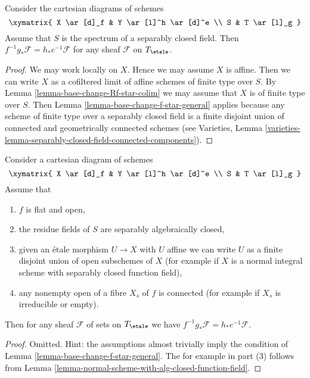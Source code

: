 \begin{lemma}
\label{lemma-base-change-f-star-field}
Consider the cartesian diagrams of schemes
$$
\xymatrix{
X \ar[d]_f & Y \ar[l]^h \ar[d]^e \\
S & T \ar[l]_g
}
$$
Assume that $S$ is the spectrum of a separably closed field.
Then $f^{-1}g_*\mathcal{F} = h_*e^{-1}\mathcal{F}$
for any sheaf $\mathcal{F}$ on $T_\etale$.
\end{lemma}

\begin{proof}
We may work locally on $X$. Hence we may assume $X$ is affine.
Then we can write $X$ as a cofiltered limit of affine schemes of
finite type over $S$. By Lemma \ref{lemma-base-change-Rf-star-colim}
we may assume that $X$ is of finite type over $S$.
Then Lemma \ref{lemma-base-change-f-star-general}
applies because any scheme of finite
type over a separably closed field is a finite disjoint
union of connected and geometrically connected schemes
(see Varieties, Lemma
\ref{varieties-lemma-separably-closed-field-connected-components}).
\end{proof}

\begin{lemma}
\label{lemma-base-change-f-star-valuation}
Consider a cartesian diagram of schemes
$$
\xymatrix{
X \ar[d]_f & Y \ar[l]^h \ar[d]^e \\
S & T \ar[l]_g
}
$$
Assume that
\begin{enumerate}
\item $f$ is flat and open,
\item the residue fields of $S$ are separably algebraically closed,
\item given an \'etale morphism $U \to X$ with $U$ affine
we can write $U$ as a finite disjoint union of open subschemes
of $X$ (for example if $X$ is a normal integral scheme
with separably closed function field),
\item any nonempty open of a fibre $X_s$ of $f$ is connected
(for example if $X_s$ is irreducible or empty).
\end{enumerate}
Then for any sheaf $\mathcal{F}$ of sets on $T_\etale$ we have
$f^{-1}g_*\mathcal{F} = h_*e^{-1}\mathcal{F}$.
\end{lemma}

\begin{proof}
Omitted. Hint: the assumptions almost trivially imply
the condition of Lemma \ref{lemma-base-change-f-star-general}.
The for example in part (3) follows from
Lemma \ref{lemma-normal-scheme-with-alg-closed-function-field}.
\end{proof}

